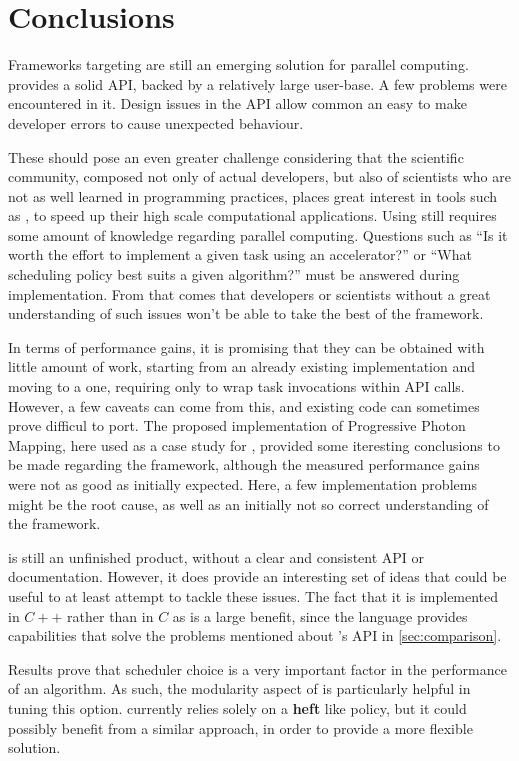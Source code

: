 \documentclass[main.tex]{subfiles}
\begin{document}
\chapter{Conclusions} \label{chapter:conclusions}

Frameworks targeting \hetplats are still an emerging solution for parallel computing. \starpu provides a solid API, backed by a relatively large user-base. A few problems were encountered in it. Design issues in the API allow common an easy to make developer errors to cause unexpected behaviour.

These should pose an even greater challenge considering that the scientific community, composed not only of actual developers, but also of scientists who are not as well learned in programming practices, places great interest in tools such as \starpu, to speed up their high scale computational applications. Using \starpu still requires some amount of knowledge regarding parallel computing. Questions such as ``Is it worth the effort to implement a given task using an accelerator?'' or ``What scheduling policy best suits a given algorithm?'' must be answered during implementation. From that comes that developers or scientists without a great understanding of such issues won't be able to take the best of the framework.

In terms of performance gains, it is promising that they can be obtained with little amount of work, starting from an already existing implementation and moving to a \starpu one, requiring only to wrap task invocations within \starpu API calls. However, a few caveats can come from this, and existing code can sometimes prove difficul to port.
The proposed implementation of Progressive Photon Mapping, here used as a case study for \starpu, provided some iteresting conclusions to be made regarding the framework, although the measured performance gains were not as good as initially expected. Here, a few implementation problems might be the root cause, as well as an initially not so correct understanding of the framework.


\gama is still an unfinished product, without a clear and consistent API or documentation. However, it does provide an interesting set of ideas that could be useful to at least attempt to tackle these issues. The fact that it is implemented in $C++$ rather than in $C$ as \starpu is a large benefit, since the language provides capabilities that solve the problems mentioned about \starpu's API in \cref{sec:comparison}.

Results prove that scheduler choice is a very important factor in the performance of an algorithm. As such, the modularity aspect of \starpu is particularly helpful in tuning this option. \gama currently relies solely on a \textbf{heft} like policy, but it could possibly benefit from a similar approach, in order to provide a more flexible solution.
\end{document}
